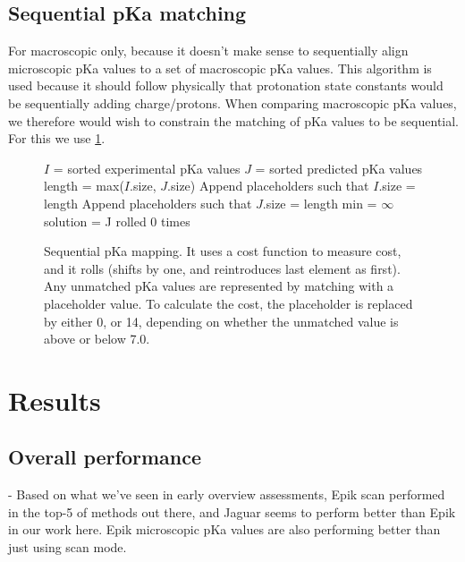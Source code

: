 \documentclass[9pt,lineno,final]{elife}
\begin{document}
\subsection{Sequential pKa matching}

For macroscopic only, because it doesn't make sense to sequentially align microscopic pKa values to a set of macroscopic pKa values. 
%
This algorithm is used because it should follow physically that protonation state constants would be sequentially adding charge/protons.
%
When comparing macroscopic pKa values, we therefore would wish to constrain the matching of pKa values to be sequential. For this we use \cref{alg:sequential}.

\begin{figure}[H]
	\begin{algorithm}[H]
		\SetAlgoLined
		\caption{Sequential pKa mapping. It uses a cost function to measure cost, and it rolls (shifts by one, and reintroduces last element as first). Any unmatched pKa values are represented by matching with a placeholder value. To calculate the cost, the placeholder is replaced by either 0, or 14, depending on whether the unmatched value is above or below 7.0.}
		\label{alg:sequential}
		 
		$I$ = sorted experimental pKa values \;
		$J$ = sorted predicted pKa values \;
		length = max($I$.size, $J$.size)\;
		Append placeholders such that $I$.size = length \;
		Append placeholders such that $J$.size = length \;
		min = $\infty$\;
		solution = J rolled 0 times\;
	\end{algorithm}
\end{figure}

\section{Results}

\subsection{Overall performance}

- Based on what we've seen in early overview assessments, Epik scan performed in the top-5 of methods out there, and Jaguar seems to perform better than Epik in our work here. Epik microscopic pKa values are also performing better than just using scan mode.
\end{document}
